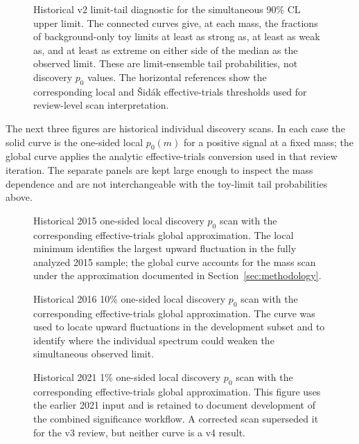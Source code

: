 \begin{figure}[p]
\centering
{}
\caption{Historical v2 limit-tail diagnostic for the simultaneous 90\% CL upper
limit. The connected curves give, at each mass, the fractions of background-only toy
limits at least as strong as, at least as weak as, and at least as extreme on either
side of the median as the observed limit. These are limit-ensemble tail probabilities,
not discovery $p_0$ values. The horizontal references show the corresponding local
and \v{S}id\'ak effective-trials thresholds used for review-level scan interpretation.}
\label{fig:app-v2-tail-diagnostic}
\end{figure}

The next three figures are historical individual discovery scans. In each case the
solid curve is the one-sided local $p_0(m)$ for a positive signal at a fixed mass; the
global curve applies the analytic effective-trials conversion used in that review
iteration. The separate panels are kept large enough to inspect the mass dependence
and are not interchangeable with the toy-limit tail probabilities above.

\begin{figure}[p]
\centering
{}
\caption{Historical 2015 one-sided local discovery $p_0$ scan with the corresponding
effective-trials global approximation. The local minimum identifies the largest
upward fluctuation in the fully analyzed 2015 sample; the global curve accounts for
the mass scan under the approximation documented in Section~\ref{sec:methodology}.}
\label{fig:local-significances-across-datasets}
\end{figure}

\begin{figure}[p]
\centering
{}
\caption{Historical 2016 10\% one-sided local discovery $p_0$ scan with the
corresponding effective-trials global approximation. The curve was used to locate
upward fluctuations in the development subset and to identify where the individual
spectrum could weaken the simultaneous observed limit.}
\label{fig:app-historical-local-p0-2016}
\end{figure}

\begin{figure}[p]
\centering
{}
\caption{Historical 2021 1\% one-sided local discovery $p_0$ scan with the
corresponding effective-trials global approximation. This figure uses the earlier
2021 input and is retained to document development of the combined significance
workflow. A corrected scan superseded it for the v3 review, but neither curve is a v4
result.}
\label{fig:app-historical-local-p0-2021}
\end{figure}

